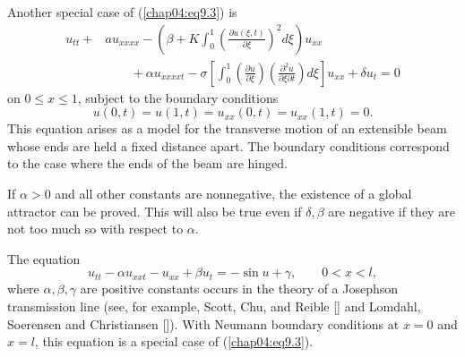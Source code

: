 \documentclass{surv-l}
\theoremstyle{plain}
\theoremstyle{definition}
\numberwithin{equation}{section}
\numberwithin{figure}{chapter}
\begin{document}
Another special case of (\ref{chap04:eq9.3}) is
\begin{align}\label{chap04:eq9.5}
u_{tt}+&au_{xxxx}-\left(\beta+K\int_{0}^{1}\left(\frac{\partial u\left(\xi,t\right)}{\partial\xi}\right)^{2}d\xi\right)u_{xx}\\
&\qquad+\alpha u_{xxxxt}-\sigma\left[\int_{0}^{1}\left(\frac{\partial u}{\partial\xi}\right)\left(\frac{\partial^{2}u}{\partial\xi\partial t}\right)d\xi\right]u_{xx}+\delta u_{t}=0\nonumber
\end{align}
on $0\leq x\leq 1$, subject to the boundary conditions
\begin{equation*}
u(0, t)=u(1, t)=u_{xx}(0, t)=u_{xx}(1, t)=0.
\end{equation*}
This equation arises as a model for the transverse motion of an extensible beam whose ends are held a fixed distance apart. The boundary conditions correspond to the case where the ends of the beam are hinged.

If $\alpha>0$ and all other constants are nonnegative, the existence of a global attractor can be proved. This will also be true even if $\delta, \beta$ are negative if they are not too much so with respect to $\alpha$.

The equation
\begin{equation*}
 u_{tt}-\alpha u_{xxt}-u_{xx}+\beta u_{t}=-\sin u+\gamma,\qquad 0<x<l,
\end{equation*}
where $\alpha,\beta,\gamma$ are positive constants occurs in the theory of a Josephson
transmission line (see, for example, Scott, Chu, and Reible [\citeyear{1976scr}] and Lomdahl, Soerensen and Christiansen [\citeyear{1982lsc}]). With Neumann boundary conditions at $x =0$ and $x=l$, this equation is a special case of (\ref{chap04:eq9.3}).
\end{document}
